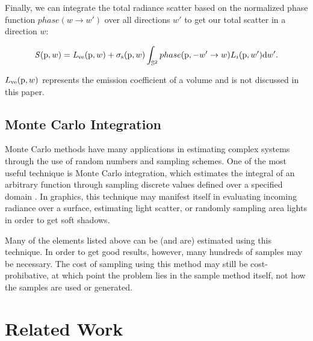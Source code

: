 \documentclass[12pt]{ucthesis}
\begin{document}
Finally, we can integrate the total radiance scatter based on the normalized phase function $phase(w \to w')$ over all directions $w'$ to get our total scatter in a direction $w$:

\begin{displaymath}
\mathit{S}(\textup{p},w) = \mathit{L}_{\textup{ve}}(\textup{p},w) + \sigma_{\textup{s}}(\textup{p}, w) \int_{\mathbb{S}^2} phase(\textup{p}, -w' \to w) L_{i}(\textup{p},w')\textup{d}w'.
\end{displaymath}

$L_{\textup{ve}}(\textup{p}, w)$ represents the emission coefficient of a volume and is not discussed in this paper.


\section{Monte Carlo Integration}

Monte Carlo methods have many applications in estimating complex systems through the use of random numbers and sampling schemes.  One of the most useful technique is Monte Carlo integration, which estimates the integral of an arbitrary function through sampling discrete values defined over a specified domain \cite{aga}.  In graphics, this technique may manifest itself in evaluating incoming radiance over a surface, estimating light scatter, or randomly sampling area lights in order to get soft shadows.

Many of the elements listed above can be (and are) estimated using this technique.  In order to get good results, however, many hundreds of samples may be necessary.  The cost of sampling using this method may still be cost-prohibative, at which point the problem lies in the sample method itself, not how the samples are used or generated.

\chapter{Related Work}
\end{document}
